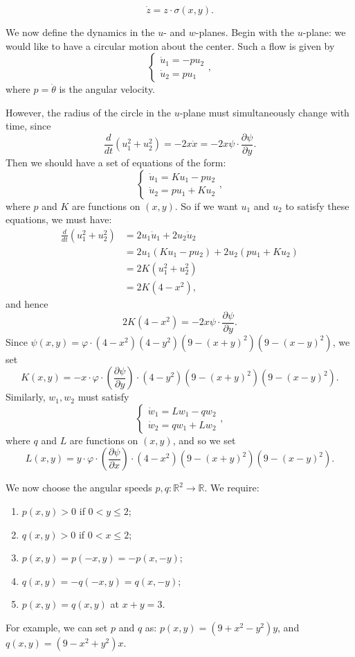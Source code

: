 \documentclass[11pt,reqno]{amsart}
\theoremstyle{plain}
\theoremstyle{definition}
\theoremstyle{remark}
\theoremstyle{plain}
\numberwithin{equation}{section}
\newcommand{\R}{\mathbb{R}}
\begin{document}
							\begin{equation}\label{def:dot-z}
								\dot{z}=z\cdot \sigma(x,y).
							\end{equation}
							
							We now define the dynamics in the \(u\)- and \(w\)-planes. Begin with the $u$-plane: we would like to have a circular motion about the center. Such a flow is given by $$\begin{cases}
								\dot{u}_{1}=-pu_{2}\\
								\dot{u}_{2}=pu_{1}
							\end{cases},$$ where $p=\dot{\theta}$ is the angular velocity. 
							
							However, the radius of the circle in the $u$-plane must simultaneously change with time, since $$\frac{d}{dt}(u_{1}^{2}+u_{2}^{2})=-2x\dot{x}=-2x\psi\cdot \frac{\partial \psi}{\partial y}.$$ Then we should have a set of equations of the form: $$\begin{cases}
								\dot{u}_{1}=Ku_{1}-pu_{2}\\
								\dot{u}_{2}=pu_{1}+Ku_{2}
							\end{cases},$$ where $p$ and $K$ are functions on $(x,y)$. So if we want $u_{1}$ and $u_{2}$ to satisfy these equations, we must have: \begin{align*}
								\frac{d}{dt}(u_{1}^{2}+u_{2}^{2})&=2u_{1}\dot{u}_{1}+2u_{2}\dot{u}_{2}\\
								&=2u_{1}(Ku_{1}-pu_{2})+2u_{2}(pu_{1}+Ku_{2})\\&=2K(u_{1}^{2}+u_{2}^{2})\\&=2K(4-x^{2}), 
							\end{align*} and hence $$2K(4-x^{2})=-2x\psi\cdot \frac{\partial \psi}{\partial y}.$$ Since $\psi(x,y)=\varphi\cdot (4-x^{2})(4-y^{2})(9-(x+y)^{2})(9-(x-y)^{2})$, we set $$K(x,y)=-x\cdot \varphi \cdot \left(\frac{\partial \psi}{\partial y}\right)\cdot (4-y^{2})(9-(x+y)^{2})(9-(x-y)^{2}).$$ Similarly, $w_{1},w_{2}$ must satisfy $$\begin{cases}
								\dot{w}_{1}=Lw_{1}-qw_{2}\\
								\dot{w}_{2}=qw_{1}+Lw_{2}
							\end{cases},$$ where $q$ and $L$ are functions on $(x,y)$, and so we set $$L(x,y)=y\cdot \varphi \cdot \left(\frac{\partial \psi}{\partial x}\right)\cdot (4-x^{2})(9-(x+y)^{2})(9-(x-y)^{2}).$$ 
							
							We now choose the angular speeds \(p,q:\R^2\to\R\).  We require:
						   \begin{enumerate}[label=\((\roman*)\)]
								\item \label{p e positivo} $p(x,y)>0$ if $0<y\leq 2$;
								\item \label{q e positivo} $q(x,y)>0$ if $0<x\leq 2$;
								\item \label{p e simetrico} $p(x,y)=p(-x,y)=-p(x,-y)$;
								\item \label{q e simetrico} $q(x,y)=-q(-x,y)=q(x,-y)$;
								\item \label{p=q} $p(x,y)=q(x,y)$ at $x+y=3$.        
							\end{enumerate} For example, we can set $p$ and $q$ as: $p(x,y)=(9+x^{2}-y^{2})y$, and $q(x,y)=(9-x^{2}+y^{2})x$.
							
\end{document}
